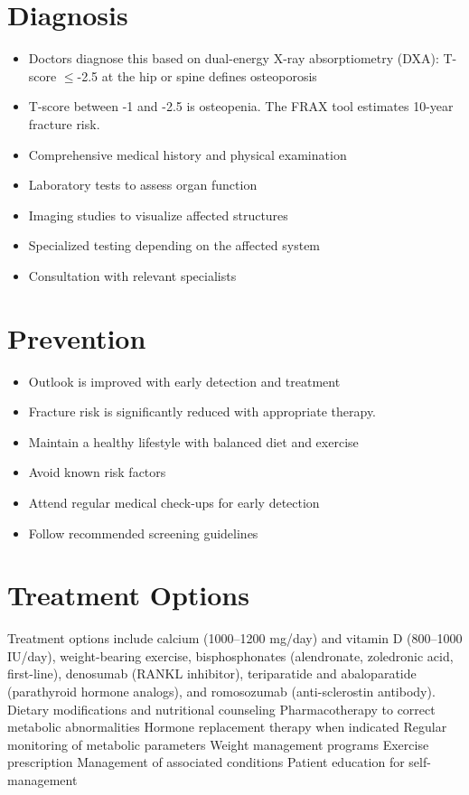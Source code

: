 \section{Diagnosis}
\begin{itemize}[noitemsep]
  \item Doctors diagnose this based on dual-energy X-ray absorptiometry (DXA): T-score $\leq$-2.5 at the hip or spine defines osteoporosis
  \item T-score between -1 and -2.5 is osteopenia. The FRAX tool estimates 10-year fracture risk.
  \item Comprehensive medical history and physical examination
  \item Laboratory tests to assess organ function
  \item Imaging studies to visualize affected structures
  \item Specialized testing depending on the affected system
  \item Consultation with relevant specialists
\end{itemize}
\section{Prevention}
\begin{itemize}[noitemsep]
  \item Outlook is improved with early detection and treatment
  \item Fracture risk is significantly reduced with appropriate therapy.
  \item Maintain a healthy lifestyle with balanced diet and exercise
  \item Avoid known risk factors
  \item Attend regular medical check-ups for early detection
  \item Follow recommended screening guidelines
\end{itemize}
\section{Treatment Options}
Treatment options include calcium (1000--1200 mg/day) and vitamin D (800--1000 IU/day), weight-bearing exercise, bisphosphonates (alendronate, zoledronic acid, first-line), denosumab (RANKL inhibitor), teriparatide and abaloparatide (parathyroid hormone analogs), and romosozumab (anti-sclerostin antibody). Dietary modifications and nutritional counseling Pharmacotherapy to correct metabolic abnormalities Hormone replacement therapy when indicated Regular monitoring of metabolic parameters Weight management programs Exercise prescription Management of associated conditions Patient education for self-management

